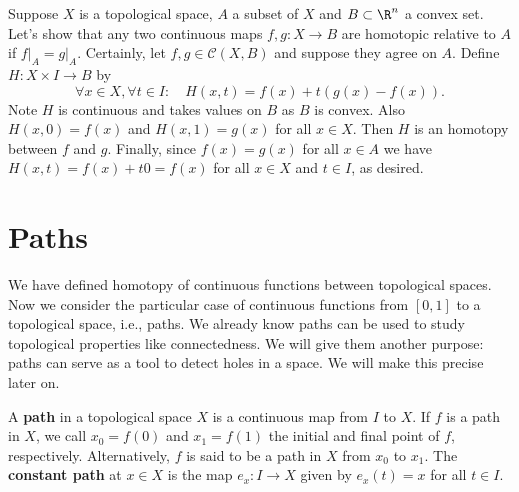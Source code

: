 \begin{example}
    


Suppose \(X\) is a topological space, \(A \) a subset of \(X\) and  \(B\subset \R^n\) a  convex set. Let's show that any two continuous maps \(f,g\colon X\to B\) are homotopic relative to \(A\) if \(f\rvert_{A} = g\rvert_A\). Certainly, let \(f,g\in \mathcal{C}(X,B)\)   and suppose they agree on \(A\). Define \(H\colon X\times I\to B\) by \[
    \forall x\in X,\forall t\in I:\quad H(x,t) = f(x) + t(g(x) - f(x)).
\] Note \(H\) is continuous and takes values on \(B\) as \(B\) is convex. Also \(H(x,0) = f(x)\) and \(H(x,1) = g(x)\) for all \(x\in X\).
Then \(H\) is an homotopy between \(f\) and \(g\).  Finally, since \(f(x) = g(x)\) for all \(x\in A\) we have \(H(x,t) = f(x) + t 0 = f(x)\) for all \(x\in X\) and \(t\in I\), as desired. 
\end{example}




\section{Paths}

We have defined homotopy of continuous functions between topological spaces. Now we consider  the particular case of continuous functions from \([0,1]\) to a topological space, i.e., paths. We already know paths can be used to study topological properties like connectedness. We will give them another purpose: paths can serve as a tool to detect holes in a space. We will make this precise later on.

\begin{definitionn}[Path]
    A \textbf{path} in a topological space \(X\) is a continuous map from \(I\) to \(X\). If \(f\) is a path in \(X\), we call \(x_0=f(0)\) and \(x_1=f(1)\) the initial and final point of \(f\), respectively. Alternatively, \(f\) is said to be a path in \(X\) from \(x_0\) to \(x_1\).
    The \textbf{constant path} at \(x\in X\) is the map \(e_{x}\colon I\to X\) given by \(e_x (t) = x\) for all \(t\in I\).
\end{definitionn}


